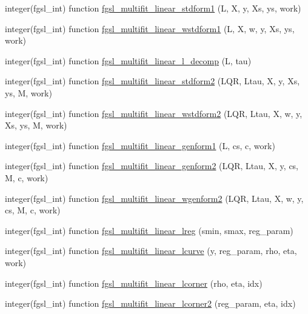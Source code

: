 \begin{DoxyCompactItemize}
\item 
integer(fgsl\+\_\+int) function \hyperlink{multifit_8finc_a90e3b23ed2d694befd3201ebf3d13a58}{fgsl\+\_\+multifit\+\_\+linear\+\_\+stdform1} (L, X, y, Xs, ys, work)
\item 
integer(fgsl\+\_\+int) function \hyperlink{multifit_8finc_a1681f8c1fb724a0ef27aa58f7512761b}{fgsl\+\_\+multifit\+\_\+linear\+\_\+wstdform1} (L, X, w, y, Xs, ys, work)
\item 
integer(fgsl\+\_\+int) function \hyperlink{multifit_8finc_a22be77a0bb859eefe464196f4c5e637d}{fgsl\+\_\+multifit\+\_\+linear\+\_\+l\+\_\+decomp} (L, tau)
\item 
integer(fgsl\+\_\+int) function \hyperlink{multifit_8finc_aa393798a395cadf4cfdda64d4c1b007b}{fgsl\+\_\+multifit\+\_\+linear\+\_\+stdform2} (L\+Q\+R, Ltau, X, y, Xs, ys, M, work)
\item 
integer(fgsl\+\_\+int) function \hyperlink{multifit_8finc_a47142632bfff7d85260cd7b3d0bde8e7}{fgsl\+\_\+multifit\+\_\+linear\+\_\+wstdform2} (L\+Q\+R, Ltau, X, w, y, Xs, ys, M, work)
\item 
integer(fgsl\+\_\+int) function \hyperlink{multifit_8finc_a0f9b743f8d2bb7618e940329b28c9408}{fgsl\+\_\+multifit\+\_\+linear\+\_\+genform1} (L, cs, c, work)
\item 
integer(fgsl\+\_\+int) function \hyperlink{multifit_8finc_ae9e5e8c453c151618a7cd0c3b5dcf2f3}{fgsl\+\_\+multifit\+\_\+linear\+\_\+genform2} (L\+Q\+R, Ltau, X, y, cs, M, c, work)
\item 
integer(fgsl\+\_\+int) function \hyperlink{multifit_8finc_a481f17b9c7ea8186a4215083afc4a95b}{fgsl\+\_\+multifit\+\_\+linear\+\_\+wgenform2} (L\+Q\+R, Ltau, X, w, y, cs, M, c, work)
\item 
integer(fgsl\+\_\+int) function \hyperlink{multifit_8finc_adeafa9a6e95a62d4e8521e88fe9d96cf}{fgsl\+\_\+multifit\+\_\+linear\+\_\+lreg} (smin, smax, reg\+\_\+param)
\item 
integer(fgsl\+\_\+int) function \hyperlink{multifit_8finc_a69f9c3c37da0382afa932b910cb2ad9f}{fgsl\+\_\+multifit\+\_\+linear\+\_\+lcurve} (y, reg\+\_\+param, rho, eta, work)
\item 
integer(fgsl\+\_\+int) function \hyperlink{multifit_8finc_a5bb0a5900abaaa9d0370d4289f437c18}{fgsl\+\_\+multifit\+\_\+linear\+\_\+lcorner} (rho, eta, idx)
\item 
integer(fgsl\+\_\+int) function \hyperlink{multifit_8finc_a3dfb40cb704ed914fe48c74526dfb4c3}{fgsl\+\_\+multifit\+\_\+linear\+\_\+lcorner2} (reg\+\_\+param, eta, idx)
\item 

\end{DoxyCompactItemize}
